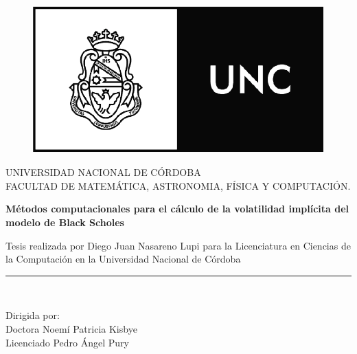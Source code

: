 \documentclass[a4paper,openright, 12pt, oneside]{book}
\begin{document}
\begin{titlepage}
\begin{center}


\begin{figure}
  \begin{center}
    \leavevmode

    \includegraphics[width=0.6\linewidth]{UNCLOGO.png}
  \end{center}
\end{figure}

\vspace*{0.4in}
UNIVERSIDAD NACIONAL DE C\'ORDOBA\\
\vspace*{0.15in}
FACULTAD DE MATEM\'ATICA, ASTRONOMIA, F\'ISICA Y COMPUTACI\'ON.\\
\vspace*{0.6in}
\begin{large}
\end{large}
\vspace*{0.2in}
\begin{Large}
\textbf{M\'etodos computacionales para el c\'alculo de la volatilidad impl\'icita del modelo de Black Scholes} \\
\end{Large}
\vspace*{0.3in}
\begin{large}
Tesis realizada por Diego Juan Nasareno Lupi para la Licenciatura en Ciencias de la Computaci\'on en la Universidad Nacional de C\'ordoba\end{large}

\vspace*{0.3in}
\rule{80mm}{0.1mm}\\
\vspace*{0.1in}
\begin{large}
Dirigida por: \\
Doctora Noem\'i Patricia Kisbye \\
Licenciado Pedro \'Angel Pury\\
\vspace*{0.1in}
\end{large}
\end{center}
\end{titlepage}
\end{document}
